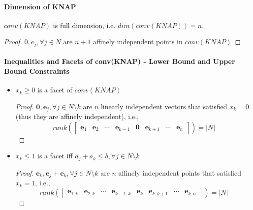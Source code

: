            \paragraph{Dimension of KNAP}
                $conv(KNAP)$ is full dimension, i.e. $dim(conv(KNAP))=n$.\\
                \begin{proof}
                    $0, e_j, \forall j\in N$ are $n + 1$ affinely independent points in $conv(KNAP)$
                \end{proof}

            \paragraph{Inequalities and Facets of conv(KNAP) - Lower Bound and Upper Bound Constraints}
                \begin{itemize}
                    \item $x_k\ge 0$ is a facet of $conv(KNAP)$
                        \begin{proof}
                            $\mathbf{0}, \mathbf{e}_j, \forall j\in N\setminus k$ are $n$ linearly independent vectors that satisfied $x_k = 0$ (thus they are affinely independent), i.e.,
                            \begin{equation*}
                                rank(\begin{bmatrix}
                                    \textbf{e}_1 & \textbf{e}_2 & \cdots & \textbf{e}_{k - 1} & \textbf{0} & \textbf{e}_{k + 1} & \cdots & \textbf{e}_n
                                \end{bmatrix}) = |N|
                            \end{equation*}
                        \end{proof}

                    \item $x_k\le 1$ is a facet iff $a_j + a_k \le b, \forall j\in N \setminus k$
                        \begin{proof}
                            $\textbf{e}_k, \textbf{e}_j+\textbf{e}_k, \forall j \in N\setminus k$ are $n$ affinely independent points that satisfied $x_k = 1$, i.e.,
                            \begin{equation*}
                                rank(\begin{bmatrix}
                                    \mathbf{e}_{1, k} & \mathbf{e}_{2, k} & \cdots & \mathbf{e}_{k - 1, k} & \mathbf{e}_k & \mathbf{e}_{k, k + 1} & \cdots & \mathbf{e}_{k, n}
                                \end{bmatrix}) = |N|
                            \end{equation*}
                        \end{proof}
                \end{itemize}                

